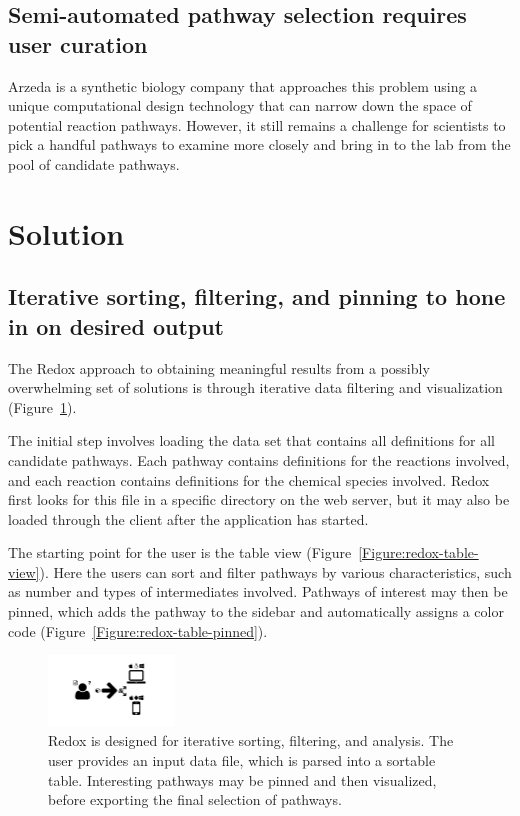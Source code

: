 \subsection{Semi-automated pathway selection requires user curation}
Arzeda is a synthetic biology company that approaches this problem using a unique computational design technology that can narrow down the space of potential reaction pathways.
However, it still remains a challenge for scientists to pick a handful pathways to examine more closely and bring in to the lab from the pool of candidate pathways.


\section{Solution}

\subsection{Iterative sorting, filtering, and pinning to hone in on desired output}

The Redox approach to obtaining meaningful results from a possibly overwhelming set of solutions is through iterative data filtering and visualization (Figure~\ref{Figure:redox-flow}).

The initial step involves loading the data set that contains all definitions for all candidate pathways.
Each pathway contains definitions for the reactions involved, and each reaction contains definitions for the chemical species involved.
Redox first looks for this file in a specific directory on the web server, but it may also be loaded through the client after the application has started.

The starting point for the user is the table view (Figure~\ref{Figure:redox-table-view}).
Here the users can sort and filter pathways by various characteristics, such as number and types of intermediates involved.
Pathways of interest may then be pinned, which adds the pathway to the sidebar and automatically assigns a color code (Figure~\ref{Figure:redox-table-pinned}).

\begin{figure}
  \includegraphics[width=0.3\textwidth, page=29,trim=0cm 0cm 18.3cm 0cm, clip=true]{images/Figures.pdf}
  \caption{Redox is designed for iterative sorting, filtering, and analysis. The user provides an input data file, which is parsed into a sortable table. Interesting pathways may be pinned and then visualized, before exporting the final selection of pathways.}
  \label{Figure:redox-flow}
\end{figure}
